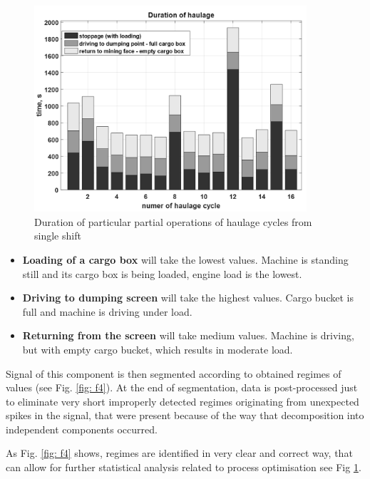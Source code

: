 \begin{figure}[ht!]
\centering
\includegraphics[width = 0.9\textwidth]{Wykresy/staty_czasy.png}
\caption{Duration of particular partial operations of haulage cycles from single shift}
\label{fig: f5}
\end{figure}
\begin{itemize}
\renewcommand{\labelitemi}{$\bullet$}
\item \textbf{Loading of a cargo box} will take the lowest values. Machine is standing still and its cargo box is being loaded, engine load is the lowest.
\item \textbf{Driving to dumping screen} will take the highest values. Cargo bucket is full and machine is driving under load.
\item \textbf{Returning from the screen} will take medium values. Machine is driving, but with empty cargo bucket, which results in moderate load.
\end{itemize}
Signal of this component is then segmented according to obtained regimes of values (see Fig. \ref{fig: f4}). At the end of segmentation, data is post-processed just to eliminate very short improperly detected regimes originating from unexpected spikes in the signal, that were present because of the way that decomposition into independent components occurred.\par
As Fig. \ref{fig: f4} shows, regimes are identified in very clear and correct way, that can allow for further statistical analysis related to process optimisation see Fig \ref{fig: f5}.
